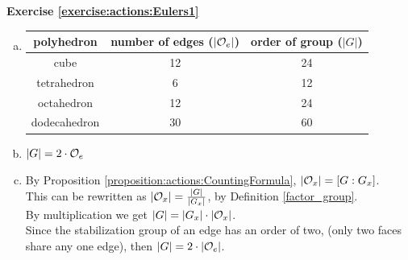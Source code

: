 \noindent\textbf{Exercise \ref{exercise:actions:Eulers1}}
\begin{enumerate}[(a)]
\item
%
\begin{tabular}{|c | c | c|}\hline
polyhedron & number of edges ($|{\cal O}_e|$) & order of group ($|G|$)\\ \hline
cube &  12 &   24\\ \hline
tetrahedron &  6&   12\\ \hline
octahedron & 12 &24\\ \hline
dodecahedron &  30&60\\ \hline 
\end{tabular}

\item
$|G| = 2 \cdot {\cal O}_e$

\item 
By Proposition \ref{proposition:actions:CountingFormula}, $|{\cal O}_x| = [G : G_x]$.  
\\
This can be rewritten as $|{\cal O}_x| = \frac{|G|}{|{G_x|}}$, by Definition \ref{factor_group}.
\\
By multiplication we get $|G| = |G_x| \cdot |{\cal O}_x|$. 
\\
Since the stabilization group of an edge has an order of two, (only two faces share any one edge), then $|G| = 2 \cdot |{\cal O}_e|$.
\end{enumerate}


